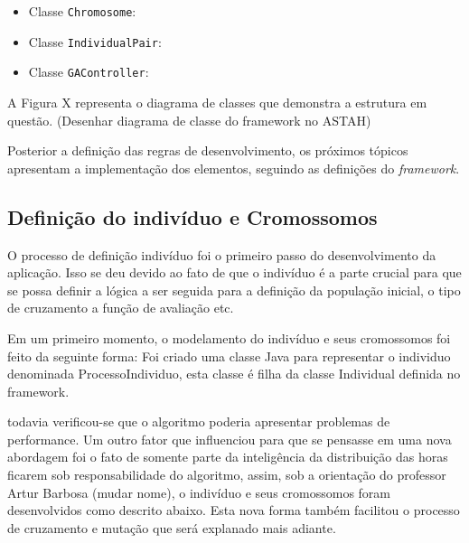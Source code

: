 \begin{itemize}
	\item Classe \texttt{Chromosome}:
	\par 
	
	\item Classe \texttt{IndividualPair}:
	\par
	
	
	\item Classe \texttt{GAController}:
	
	
\end{itemize}

A Figura X representa o diagrama de classes que demonstra a estrutura em questão.
(Desenhar diagrama de classe do framework no ASTAH)


\par Posterior a definição das regras de desenvolvimento, os próximos tópicos apresentam a implementação 
dos elementos, seguindo as definições do \textit{framework}.

\subsection{Definição do indivíduo e Cromossomos}
\par O processo de definição indivíduo foi o primeiro passo do desenvolvimento da aplicação. Isso 
se deu devido ao fato de que o indivíduo é a parte crucial para que se possa definir a lógica a ser seguida para
a definição da população inicial, o tipo de cruzamento a função de avaliação etc.


\par Em um primeiro momento, o modelamento do indivíduo e seus cromossomos foi feito da seguinte forma:
Foi criado uma classe Java para representar o individuo denominada ProcessoIndividuo, esta classe é filha 
da classe Individual definida no framework.


todavia verificou-se que o algoritmo poderia apresentar problemas de performance. Um outro fator que 
influenciou para que se pensasse em uma nova abordagem foi o fato de somente parte da inteligência da distribuição
das horas ficarem sob responsabilidade do algoritmo, assim, sob a orientação do professor Artur Barbosa (mudar nome), 
o indivíduo e seus cromossomos foram desenvolvidos como descrito abaixo. Esta nova forma também facilitou o processo 
de cruzamento e mutação que será explanado mais adiante.




	  

